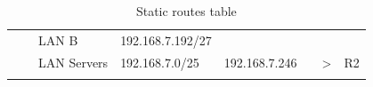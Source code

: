 \documentclass[11pt,a4paper]{report}
\begin{document}
\begin{longtable}[c]{@{}lllllclc@{}}
                    &                                & LAN B       & 192.168.7.192/27 & \multicolumn{1}{c}{}                               &                     &                                 &                     \\* \cmidrule(lr){3-5} \cmidrule(l){7-8}
                    &                                & LAN Servers & 192.168.7.0/25   & 192.168.7.246                                      &                     & \textgreater{}                  & R2                  \\* \bottomrule
\caption{Static routes table}
\label{tab:staticroutetbl}\\
\end{longtable}

\end{document}
